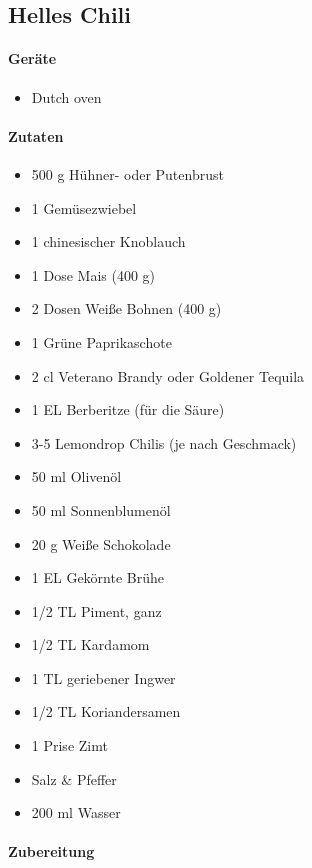 \subsection{Helles Chili}\label{Helles Chili}

\paragraph{Geräte}

\begin{itemize}[noitemsep]
	\item Dutch oven
\end{itemize}

\paragraph{Zutaten}

\begin{itemize}[noitemsep]
	\item  500 g Hühner- oder Putenbrust
	\item 1 Gemüsezwiebel
	\item 1 chinesischer Knoblauch
	\item 1 Dose Mais (400 g)
	\item 2 Dosen Weiße Bohnen (400 g)
	\item 1 Grüne Paprikaschote
	\item 2 cl Veterano Brandy oder Goldener Tequila
	\item 1 EL Berberitze (für die Säure)
	\item 3-5 Lemondrop Chilis (je nach Geschmack)
	\item 50 ml Olivenöl
	\item 50 ml Sonnenblumenöl
	\item 20 g Weiße Schokolade
	\item 1 EL Gekörnte Brühe
	\item 1/2 TL Piment, ganz
	\item 1/2 TL Kardamom
	\item 1 TL geriebener Ingwer
	\item 1/2 TL Koriandersamen
	\item 1 Prise Zimt
	\item Salz \& Pfeffer
	\item 200 ml Wasser
\end{itemize}

\paragraph{Zubereitung}

